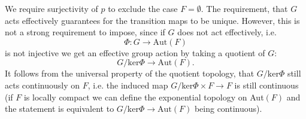 \begin{remark}
    We require surjectivity of $p$ to exclude the case $F = \emptyset$. The requirement, that $G$ acts effectively guarantees for the transition maps to be unique. However, this is not a strong requirement to impose, since if $G$ does not act effectively, i.e.
    \[
    \Phi \colon G \to \mathrm{Aut}(F)
    \]
    is not injective we get an effective group action by taking a quotient of $G$:
    \[
    G/\mathrm{ker}\Phi \to \mathrm{Aut}(F).
    \]
    It follows from the universal property of the quotient topology, that $G/\mathrm{ker}\Phi$ still acts continuously on $F$, i.e. the induced map $G/\mathrm{ker}\Phi \times F \to F$ is still continuous (if $F$ is locally compact we can define the exponential topology on Aut$(F)$ and the statement is equivalent to $G/\mathrm{ker}\Phi \to \mathrm{Aut}(F)$ being continuous).
\end{remark}

